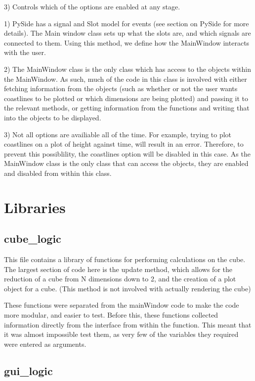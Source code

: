 \documentclass[whitecover]{MO_report}
\begin{document}
3) Controls which of the options are enabled at any stage.

\vspace{4mm}

1) PySide has a signal and Slot model for events (see section on PySide for
more details). The Main window class sets up what the slots are, and which
signals are connected to them. Using this method, we define how the MainWindow
interacts with the user. 

2) The MainWindow class is the only class which has access to the objects
within the MainWindow. As such, much of the code in this class is
involved with either fetching information from the objects (such as whether or
not the user wants coastlines to be plotted or which dimensions are being
plotted) and passing it to the relevant methods, or getting information from
the functions and writing that into the objects to be displayed.

3) Not all options are availiable all of the time. For example, trying to plot
coastlines on a plot of height against time, will result in an error. Therefore,
to prevent this possiblility, the coastlines option will be disabled in this
case. As the MainWindow class is the only class that can access the objects,
they are enabled and disabled from within this class.

\section{Libraries}

\subsection{cube\_logic}

This file contains a library of functions for performing calculations on the
cube. The largest section of code here is the update method, which allows for
the reduction of a cube from N dimensions down to 2, and the creation of a plot
object for a cube. (This method is not involved with actually rendering the
cube)

These functions were separated from the mainWindow code to make the code more
modular, and easier to test. Before this, these functions collected information
directly from the interface from within the function. This meant that it was
almost impossible test them, as very few of the variables they required were
entered as arguments.

\subsection{gui\_logic}
\end{document}
